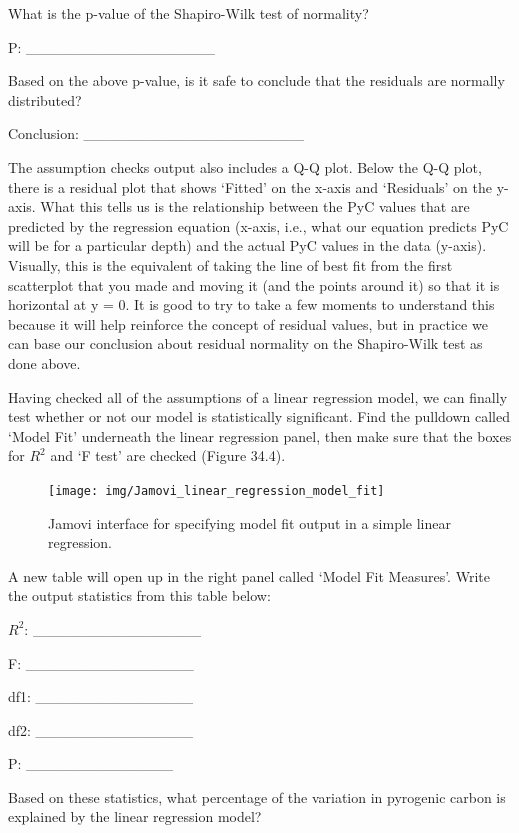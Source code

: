 \documentclass[
]{scrbook}
\begin{document}
What is the p-value of the Shapiro-Wilk test of normality?

P: \_\_\_\_\_\_\_\_\_\_\_\_\_\_\_\_\_\_

Based on the above p-value, is it safe to conclude that the residuals are normally distributed?

Conclusion: \_\_\_\_\_\_\_\_\_\_\_\_\_\_\_\_\_\_\_\_\_

The assumption checks output also includes a Q-Q plot.
Below the Q-Q plot, there is a residual plot that shows `Fitted' on the x-axis and `Residuals' on the y-axis.
What this tells us is the relationship between the PyC values that are predicted by the regression equation (x-axis, i.e., what our equation predicts PyC will be for a particular depth) and the actual PyC values in the data (y-axis).
Visually, this is the equivalent of taking the line of best fit from the first scatterplot that you made and moving it (and the points around it) so that it is horizontal at y = 0.
It is good to try to take a few moments to understand this because it will help reinforce the concept of residual values, but in practice we can base our conclusion about residual normality on the Shapiro-Wilk test as done above.

Having checked all of the assumptions of a linear regression model, we can finally test whether or not our model is statistically significant.
Find the pulldown called `Model Fit' underneath the linear regression panel, then make sure that the boxes for \(R^{2}\) and `F test' are checked (Figure 34.4).

\begin{figure}
\texttt{[image: img/Jamovi\_linear\_regression\_model\_fit]} \caption{Jamovi interface for specifying model fit output in a simple linear regression.}\label{fig:unnamed-chunk-179}
\end{figure}

A new table will open up in the right panel called `Model Fit Measures'.
Write the output statistics from this table below:

\(R^{2}\): \_\_\_\_\_\_\_\_\_\_\_\_\_\_\_\_

F: \_\_\_\_\_\_\_\_\_\_\_\_\_\_\_\_

df1: \_\_\_\_\_\_\_\_\_\_\_\_\_\_\_

df2: \_\_\_\_\_\_\_\_\_\_\_\_\_\_\_

P: \_\_\_\_\_\_\_\_\_\_\_\_\_\_

Based on these statistics, what percentage of the variation in pyrogenic carbon is explained by the linear regression model?
\end{document}

